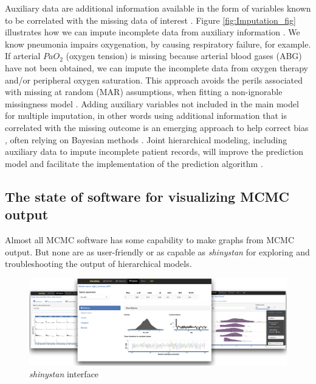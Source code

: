 \documentclass[11pt,notitlepage]{article}
\begin{document}
Auxiliary data are additional information available in the form of variables known 
to be correlated with the missing data of interest 
\cite{Hall_25389642,Daniels24571539}. Figure \ref{fig:Imputation_fig} 
illustrates how we can impute incomplete data from auxiliary information 
\cite{Ibrahim2001auxilliaryImputaton,Schomaker23873614}. We know pneumonia 
impairs oxygenation, by causing respiratory failure, for example. If 
arterial $PaO_2$ (oxygen tension) is missing because arterial blood 
gases (ABG) have not been obtained, we can impute the incomplete data 
from oxygen therapy and/or peripheral oxygen saturation\cite{Hall_25389642}. 
This approach avoids the perils associated with missing at random (MAR) 
assumptions, when fitting a non-ignorable missingness model \cite{Wang_20029935}. 
Adding auxiliary variables not included in the main model for multiple imputation, 
in other words using additional information that is correlated with the missing 
outcome is an emerging approach to help correct bias 
\cite{Meng1994, Collins_11778676, Rubin1996}, often relying on 
Bayesian methods \cite{Daniels2008, Schafer1997}. Joint hierarchical 
modeling, including auxiliary data to impute incomplete patient records, 
will improve the prediction model and facilitate the implementation of the 
prediction algorithm \cite{Hall_25389642}.

\subsection*{The state of software for visualizing MCMC output}

Almost all MCMC software has some capability to make graphs from MCMC output. But none are as
user-friendly or as capable as \textit{shinystan} for exploring and troubleshooting the output of 
hierarchical models.

\begin{figure}
  \vspace{-10pt}
 \includegraphics[scale=1.2]{Figures/shinystan.png}
  \vspace{-12pt}
  \caption{\textit{shinystan} interface}
    \label{fig:shinystan}
 \vspace{- 14pt}
\end{figure}
\end{document}
